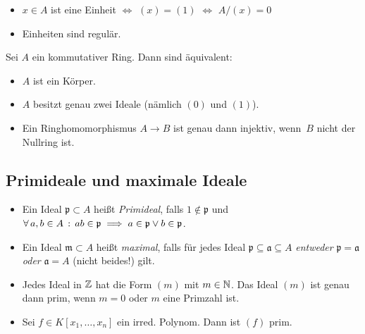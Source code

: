 \documentclass{cheat-sheet}
\newcommand{\aaa}{\mathfrak{a}}
\newcommand{\ppp}{\mathfrak{p}}
\newcommand{\mmm}{\mathfrak{m}}
\begin{document}
\begin{beob}
  \begin{itemize}
    \item $x \in A$ ist eine Einheit $\iff$ $(x) = (1)$ $\iff$ $A/(x) = 0$
    \item Einheiten sind regulär.
  \end{itemize}
\end{beob}


\begin{samepage}

\begin{prop}
  Sei $A$ ein kommutativer Ring.
  Dann sind äquivalent:
  \begin{itemize}
    \item $A$ ist ein Körper.
    \item $A$ besitzt genau zwei Ideale (nämlich $(0)$ und $(1)$).
    \item Ein Ringhomomorphismus $A \to B$ ist genau dann injektiv, wenn~$B$ nicht der Nullring ist.
  \end{itemize}
\end{prop}

\subsection{Primideale und maximale Ideale}

\end{samepage}

\begin{defn}
  \begin{itemize}
    \item Ein Ideal $\ppp \subset A$ heißt \emph{Primideal}, falls $1 \not\in \ppp$ und $\fa{a, b \in A} ab \in \ppp \implies a \in \ppp \vee b \in \ppp$.
    \item Ein Ideal $\mmm \subset A$ heißt \emph{maximal}, falls für jedes Ideal $\ppp \subseteq \aaa \subseteq A$ \textit{entweder} $\ppp = \aaa$ \textit{oder} $\aaa = A$ (nicht beides!) gilt.
  \end{itemize}
\end{defn}

\begin{bspe}
  \begin{itemize}
    \item Jedes Ideal in $\mathbb{Z}$ hat die Form $(m)$ mit $m \in \mathbb{N}$.
    Das Ideal $(m)$ ist genau dann prim, wenn $m=0$ oder $m$ eine Primzahl ist.
    \item Sei $f \in K[x_1, \ldots, x_n]$ ein irred. Polynom.
    Dann ist $(f)$ prim.
\end{itemize}
\end{bspe}
\end{document}
